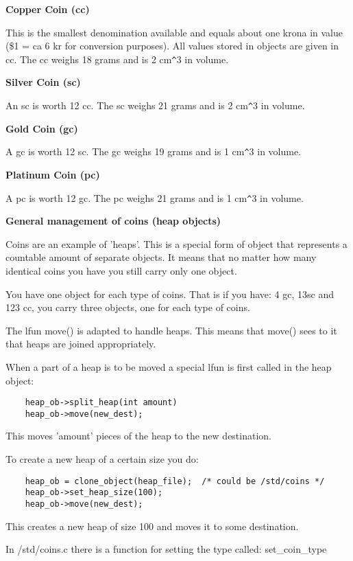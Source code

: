 {\bf Copper Coin (cc)}


This is the smallest denomination available and equals about one krona
in value (\$1 = ca 6 kr for conversion purposes). All values stored in
objects are given in cc. The cc weighs 18 grams and is 2 cm\verb+^+3 in
volume.

{\bf Silver Coin (sc)}


An sc is worth 12 cc. The sc weighs 21 grams and is 2 cm\verb+^+3 in volume.

{\bf Gold Coin (gc)}


A gc is worth 12 sc. The gc weighs 19 grams and is 1 cm\verb+^+3 in volume.

{\bf Platinum Coin (pc)}


A pc is worth 12 gc. The pc weighs 21 grams and is 1 cm\verb+^+3 in volume.

{\bf General management of coins (heap objects)}

Coins are an example of 'heaps'. This is a special form of object that
represents a countable amount of separate objects. It means that no matter
how many identical coins you have you still carry only one object.

You have one object for each type of coins. That is if you have: 4 gc, 13sc
and 123 cc, you carry three objects, one for each type of coins.

The lfun move() is adapted to handle heaps. This means that move() sees to
it that heaps are joined appropriately.

When a part of a heap is to be moved a special lfun is first called in the
heap object: 

\begin{verbatim}
    heap_ob->split_heap(int amount)
    heap_ob->move(new_dest);
\end{verbatim}

This moves 'amount' pieces of the heap to the new destination.

To create a new heap of a certain size you do:

\begin{verbatim}
    heap_ob = clone_object(heap_file);  /* could be /std/coins */
    heap_ob->set_heap_size(100);
    heap_ob->move(new_dest);
\end{verbatim}

This creates a new heap of size 100 and moves it to some destination.

In /std/coins.c there is a function for setting the type called: set\_coin\_type

